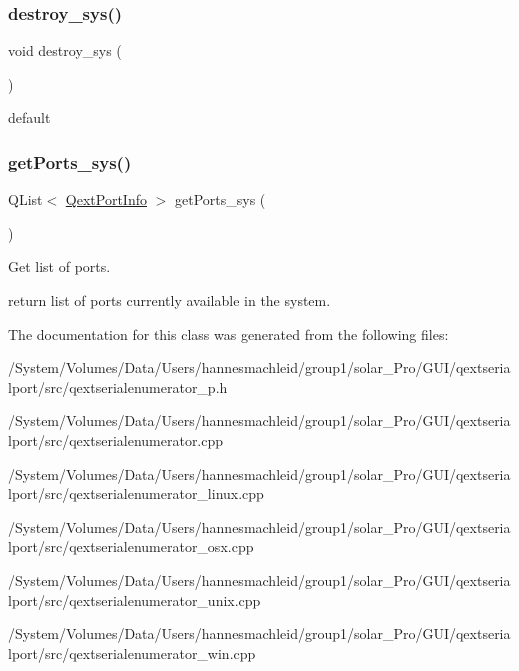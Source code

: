 \subsubsection{\texorpdfstring{destroy\_sys()}{destroy\_sys()}}
{\footnotesize\ttfamily void destroy\+\_\+sys (\begin{DoxyParamCaption}{ }\end{DoxyParamCaption})}

default \mbox{\label{class_qext_serial_enumerator_private_a0585eec8e37995f951f0d2016c7bd648}} 
\subsubsection{\texorpdfstring{getPorts\_sys()}{getPorts\_sys()}}
{\footnotesize\ttfamily Q\+List$<$ \mbox{\hyperlink{struct_qext_port_info}{Qext\+Port\+Info}} $>$ get\+Ports\+\_\+sys (\begin{DoxyParamCaption}{ }\end{DoxyParamCaption})\hspace{0.3cm}{\ttfamily [static]}}

Get list of ports.

return list of ports currently available in the system. 

The documentation for this class was generated from the following files\+:\begin{DoxyCompactItemize}
\item 
/\+System/\+Volumes/\+Data/\+Users/hannesmachleid/group1/solar\+\_\+\+Pro/\+G\+U\+I/qextserialport/src/qextserialenumerator\+\_\+p.\+h\item 
/\+System/\+Volumes/\+Data/\+Users/hannesmachleid/group1/solar\+\_\+\+Pro/\+G\+U\+I/qextserialport/src/qextserialenumerator.\+cpp\item 
/\+System/\+Volumes/\+Data/\+Users/hannesmachleid/group1/solar\+\_\+\+Pro/\+G\+U\+I/qextserialport/src/qextserialenumerator\+\_\+linux.\+cpp\item 
/\+System/\+Volumes/\+Data/\+Users/hannesmachleid/group1/solar\+\_\+\+Pro/\+G\+U\+I/qextserialport/src/qextserialenumerator\+\_\+osx.\+cpp\item 
/\+System/\+Volumes/\+Data/\+Users/hannesmachleid/group1/solar\+\_\+\+Pro/\+G\+U\+I/qextserialport/src/qextserialenumerator\+\_\+unix.\+cpp\item 
/\+System/\+Volumes/\+Data/\+Users/hannesmachleid/group1/solar\+\_\+\+Pro/\+G\+U\+I/qextserialport/src/qextserialenumerator\+\_\+win.\+cpp\end{DoxyCompactItemize}
